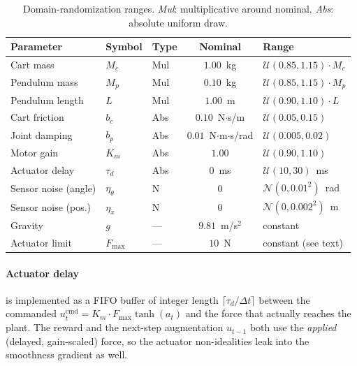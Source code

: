 \documentclass[11pt,a4paper]{article}
\begin{document}
\begin{table}[h]
\centering
\caption{Domain-randomization ranges. \emph{Mul}: multiplicative around nominal.
\emph{Abs}: absolute uniform draw.}
\label{tab:dr}
\renewcommand{\arraystretch}{1.15}
\begin{tabular}{lllcl}
\toprule
\textbf{Parameter} & \textbf{Symbol} & \textbf{Type} & \textbf{Nominal} & \textbf{Range} \\
\midrule
Cart mass            & $M_c$        & Mul & $1.00$~kg          & $\mathcal{U}(0.85, 1.15) \cdot M_c$ \\
Pendulum mass        & $M_p$        & Mul & $0.10$~kg          & $\mathcal{U}(0.85, 1.15) \cdot M_p$ \\
Pendulum length      & $L$          & Mul & $1.00$~m           & $\mathcal{U}(0.90, 1.10) \cdot L$ \\
Cart friction        & $b_c$        & Abs & $0.10$~N$\cdot$s/m & $\mathcal{U}(0.05, 0.15)$ \\
Joint damping        & $b_p$        & Abs & $0.01$~N$\cdot$m$\cdot$s/rad & $\mathcal{U}(0.005, 0.02)$ \\
Motor gain           & $K_m$        & Abs & $1.00$             & $\mathcal{U}(0.90, 1.10)$ \\
Actuator delay       & $\tau_d$     & Abs & $0$~ms             & $\mathcal{U}(10, 30)$~ms \\
Sensor noise (angle) & $\eta_\theta$ & N  & $0$                & $\mathcal{N}(0, 0.01^2)$~rad \\
Sensor noise (pos.)  & $\eta_x$     & N   & $0$                & $\mathcal{N}(0, 0.002^2)$~m \\
Gravity              & $g$          & --- & $9.81$~m/s$^2$     & constant \\
Actuator limit       & $F_{\max}$   & --- & $10$~N             & constant (see text) \\
\bottomrule
\end{tabular}
\end{table}

\paragraph{Actuator delay} is implemented as a FIFO buffer of integer length $\lceil \tau_d / \Delta t \rceil$ between the commanded $u^{\text{cmd}}_t = K_m \cdot F_{\max}\tanh(a_t)$ and the force that actually reaches the plant. The reward and the next-step augmentation $u_{t-1}$ both use the \emph{applied} (delayed, gain-scaled) force, so the actuator non-idealities leak into the smoothness gradient as well.
\end{document}
